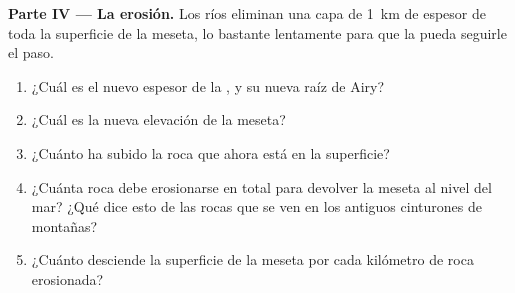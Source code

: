 \begin{problem}
\noindent\textbf{Parte IV --- La erosión.}
Los ríos eliminan una capa de \qty{1}{km} de espesor de toda la superficie de la meseta, lo bastante lentamente para que la 
pueda seguirle el paso.
\begin{enumerate}[resume]
  \item ¿Cuál es el nuevo espesor de la , y su nueva raíz de Airy?
  \item ¿Cuál es la nueva elevación de la meseta?
  \item ¿Cuánto ha subido la roca que ahora está en la superficie?
  \item ¿Cuánta roca debe erosionarse en total para devolver la meseta al nivel del mar? ¿Qué dice esto de las rocas que se ven en
        los antiguos cinturones de montañas?
  \item ¿Cuánto desciende la superficie de la meseta por cada kilómetro de roca erosionada?
\end{enumerate}
\end{problem}
